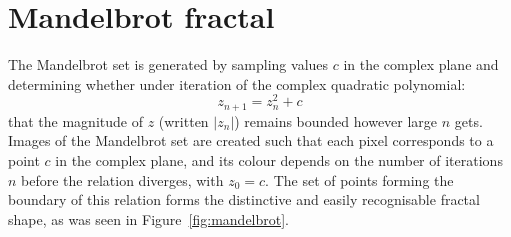 \section{Mandelbrot fractal}
\label{sec:mandelbrot}

The Mandelbrot set is generated by sampling values $c$ in the complex plane and
determining whether under iteration of the complex quadratic polynomial:
\[
z_{n+1} = z_{n}^{2} + c
\]
that the magnitude of $z$ (written $\left| z_{n} \right|$) remains bounded
however large $n$ gets. Images of the Mandelbrot set are created such that each
pixel corresponds to a point $c$ in the complex plane, and its colour depends on
the number of iterations $n$ before the relation diverges, with $z_{0} = c$. The
set of points forming the boundary of this relation forms the distinctive and
easily recognisable fractal shape, as was seen in Figure~\ref{fig:mandelbrot}.

